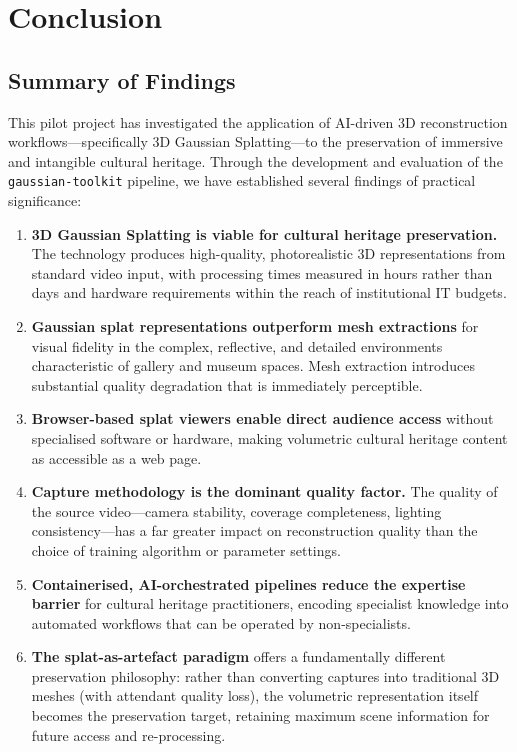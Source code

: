 \chapter{Conclusion}
\label{ch:conclusion}

\section{Summary of Findings}
\label{sec:conc-summary}

This pilot project has investigated the application of AI-driven 3D reconstruction workflows---specifically 3D Gaussian Splatting---to the preservation of immersive and intangible cultural heritage. Through the development and evaluation of the \texttt{gaussian-toolkit} pipeline, we have established several findings of practical significance:

\begin{enumerate}
  \item \textbf{3D Gaussian Splatting is viable for cultural heritage preservation.} The technology produces high-quality, photorealistic 3D representations from standard video input, with processing times measured in hours rather than days and hardware requirements within the reach of institutional IT budgets.

  \item \textbf{Gaussian splat representations outperform mesh extractions} for visual fidelity in the complex, reflective, and detailed environments characteristic of gallery and museum spaces. Mesh extraction introduces substantial quality degradation that is immediately perceptible.

  \item \textbf{Browser-based splat viewers enable direct audience access} without specialised software or hardware, making volumetric cultural heritage content as accessible as a web page.

  \item \textbf{Capture methodology is the dominant quality factor.} The quality of the source video---camera stability, coverage completeness, lighting consistency---has a far greater impact on reconstruction quality than the choice of training algorithm or parameter settings.

  \item \textbf{Containerised, AI-orchestrated pipelines reduce the expertise barrier} for cultural heritage practitioners, encoding specialist knowledge into automated workflows that can be operated by non-specialists.

  \item \textbf{The splat-as-artefact paradigm} offers a fundamentally different preservation philosophy: rather than converting captures into traditional 3D meshes (with attendant quality loss), the volumetric representation itself becomes the preservation target, retaining maximum scene information for future access and re-processing.
\end{enumerate}

